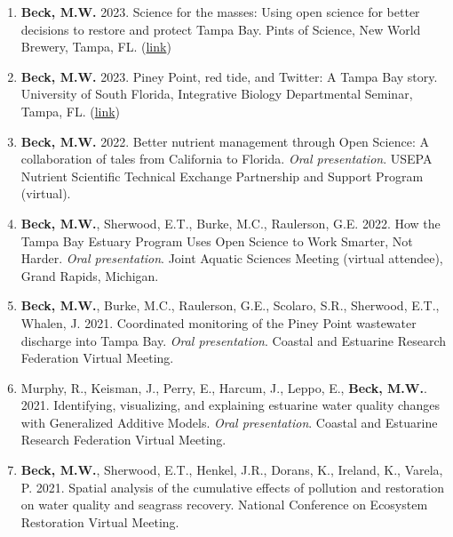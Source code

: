 \documentclass[letterpaper,12pt]{article}
\begin{document}
\begin{enumerate}

\item {\bf Beck, M.W.} 2023. Science for the masses: Using open science for better decisions to restore and protect Tampa Bay. Pints of Science, New World Brewery, Tampa, FL. ({\footnotesize\href{https://docs.google.com/presentation/d/1cphkJnifIwnk3-j4yLB2qkYiJl0wLnk5hqOFqnm0aDU/edit?usp=sharing}{link}})

\item {\bf Beck, M.W.} 2023. Piney Point, red tide, and Twitter: A Tampa Bay story. University of South Florida, Integrative Biology Departmental Seminar, Tampa, FL. ({\footnotesize\href{https://docs.google.com/presentation/d/1yfXyuxaXU2CPLWnhtApxDpyS_xuhm9fh29jPpw6MaHE/edit?usp=share_link}{link}})

\item {\bf Beck, M.W.} 2022. Better nutrient management through Open Science: A collaboration of tales from California to Florida. \textit{Oral presentation}. USEPA Nutrient Scientific Technical Exchange Partnership and Support Program (virtual).  

\item {\bf Beck, M.W.}, Sherwood, E.T., Burke, M.C., Raulerson, G.E. 2022. How the Tampa Bay Estuary Program Uses Open Science to Work Smarter, Not Harder. \textit{Oral presentation}. Joint Aquatic Sciences Meeting (virtual attendee), Grand Rapids, Michigan. 

\item {\bf Beck, M.W.}, Burke, M.C., Raulerson, G.E., Scolaro, S.R., Sherwood, E.T., Whalen, J. 2021. Coordinated monitoring of the Piney Point wastewater discharge into Tampa Bay. \textit{Oral presentation}. Coastal and Estuarine Research Federation Virtual Meeting.

\item Murphy, R., Keisman, J., Perry, E., Harcum, J., Leppo, E., {\bf Beck, M.W.}. 2021. Identifying, visualizing, and explaining estuarine water quality changes with Generalized Additive Models. \textit{Oral presentation}. Coastal and Estuarine Research Federation Virtual Meeting.

\item {\bf Beck, M.W.},  Sherwood, E.T., Henkel, J.R., Dorans, K., Ireland, K., Varela, P. 2021. Spatial analysis of the cumulative effects of pollution and restoration on water quality and seagrass recovery.  National Conference on Ecosystem Restoration Virtual Meeting.


\end{enumerate}
\end{document}
